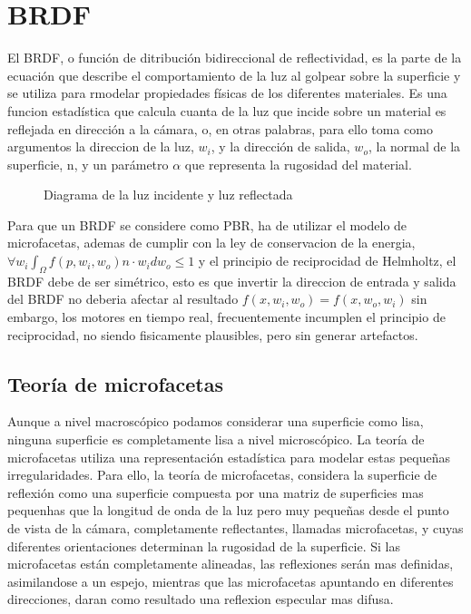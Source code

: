 \section{BRDF}

El BRDF, o función de ditribuci\'on bidireccional de reflectividad, es la parte de la ecuaci\'on que describe el
comportamiento de la luz al golpear sobre la superficie y se utiliza para rmodelar propiedades f\'isicas de los diferentes
materiales. Es una funcion estad\'istica que calcula cuanta de la luz que incide sobre un material es reflejada en direcci\'on
a la c\'amara, o, en otras palabras, para ello toma como argumentos la direccion de la luz, $w_i$, y la dirección de salida,
$w_o$, la normal de la superficie, n, y un par\'ametro $\alpha$ que representa la rugosidad del material.

\begin{figure}[H]
    \vspace{0.5cm}
    \centering
    \caption{Diagrama de la luz incidente y luz reflectada}
    \vspace{0.5cm}
\end{figure}

Para que un BRDF se considere como PBR, ha de utilizar el modelo de microfacetas, ademas de cumplir con la ley de conservacion
de la energia, $\forall w_i \int_{\Omega} f(p, w_i, w_o) n\cdot{w_i} dw_o \leq 1$ y el principio de reciprocidad de Helmholtz,
el BRDF debe de ser simétrico, esto es que invertir la direccion de entrada y salida del BRDF no deberia afectar al resultado
$f(x, w_i, w_o) = f(x, w_o, w_i)$ sin embargo, los motores en tiempo real, frecuentemente incumplen el principio de reciprocidad,
no siendo fisicamente plausibles, pero sin generar artefactos.\\

    \subsection{Teor\'ia de microfacetas}

    \bgroup

        Aunque a nivel macrosc\'opico podamos considerar una superficie como lisa, ninguna superficie es completamente lisa a nivel
        microsc\'opico. La teor\'ia de microfacetas utiliza una representaci\'on estad\'istica para modelar estas peque\~nas irregularidades.
        Para ello, la teor\'ia de microfacetas, considera la superficie de reflexi\'on como una superficie compuesta por una matriz de
        superficies mas pequenhas que la longitud de onda de la luz pero muy peque\~nas desde el punto de vista de la c\'amara,
        completamente reflectantes, llamadas microfacetas, y cuyas diferentes orientaciones determinan la rugosidad de la superficie.
        Si las microfacetas est\'an completamente alineadas, las reflexiones ser\'an mas definidas, asimilandose a un espejo, mientras
        que las microfacetas apuntando en diferentes direcciones, daran como resultado una reflexion especular mas difusa.

